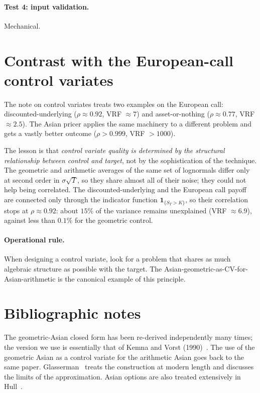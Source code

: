 \documentclass[11pt,a4paper]{article}
\theoremstyle{plain}
\theoremstyle{definition}
\theoremstyle{remark}
\newcommand{\indic}{\mathbf{1}}
\begin{document}
\paragraph{Test 4: input validation.} Mechanical.

\section{Contrast with the European-call control variates}
\label{sec:contrast}

The note on control variates treats two examples on the
European call: discounted-underlying ($\rho \approx 0.92$, VRF $\approx 7$)
and asset-or-nothing ($\rho \approx 0.77$, VRF $\approx 2.5$). The Asian
pricer applies the same machinery to a different problem and gets a vastly
better outcome ($\rho > 0.999$, VRF $> 1000$).

The lesson is that \emph{control variate quality is determined by
the structural relationship between control and target}, not by the
sophistication of the technique. The geometric and arithmetic
averages of the same set of lognormals differ only at second order
in $\sigma\sqrt{T}$, so they share almost all of their noise; they
could not help being correlated. The
discounted-underlying and the European call payoff are connected
only through the indicator function $\indic_{\{S_T > K\}}$, so their
correlation stops at $\rho \approx 0.92$: about $15\%$ of the variance
remains unexplained (VRF $\approx 6.9$), against less than $0.1\%$ for
the geometric control.

\paragraph{Operational rule.} When designing a control variate, look
for a problem that shares as much algebraic structure as possible
with the target. The Asian-geometric-as-CV-for-Asian-arithmetic is
the canonical example of this principle.

\section{Bibliographic notes}
\label{sec:biblio}

The geometric-Asian closed form has been re-derived independently
many times; the version we use is essentially that of Kemna and
Vorst (1990)~\cite{KemnaVorst1990}. The use of the geometric Asian
as a control variate for the arithmetic Asian goes back to the same
paper. Glasserman~\cite[Section 4.1.1, Example 4.1.2]{Glasserman}
treats the construction at modern length and discusses the limits of
the approximation. Asian options are also treated extensively in
Hull~\cite{Hull}.
\end{document}
